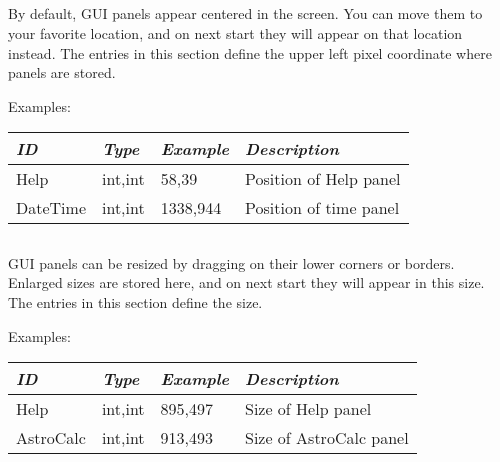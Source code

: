 \subsection{}\label{sec:config.ini:DialogPositions}

By default, GUI panels appear centered in the screen. You can move them to your favorite location, 
and on next start they will appear on that location instead.
The entries in this section define the upper left pixel coordinate where panels are stored.

Examples:

\begin{longtabu} to \textwidth {l|l|l|X}
\toprule
\emph{ID}     & \emph{Type} & \emph{Example}&\emph{Description}     \\\midrule
Help          & int,int     &  58,39        & Position of Help panel\\\midrule
DateTime      & int,int     &  1338,944     & Position of time panel\\\bottomrule
\end{longtabu}

\newpage

\subsection{}\label{sec:config.ini:DialogSizes}

GUI panels can be resized by dragging on their lower corners or borders.  
Enlarged sizes are stored here, and on next start they will appear in this size.
The entries in this section define the size.

Examples:

\begin{longtabu} to \textwidth {l|l|l|X}
\toprule
\emph{ID}     & \emph{Type} & \emph{Example}&\emph{Description}      \\\midrule
Help          & int,int     &  895,497      & Size of Help panel     \\\midrule
AstroCalc     & int,int     &  913,493      & Size of AstroCalc panel\\\bottomrule
\end{longtabu}





